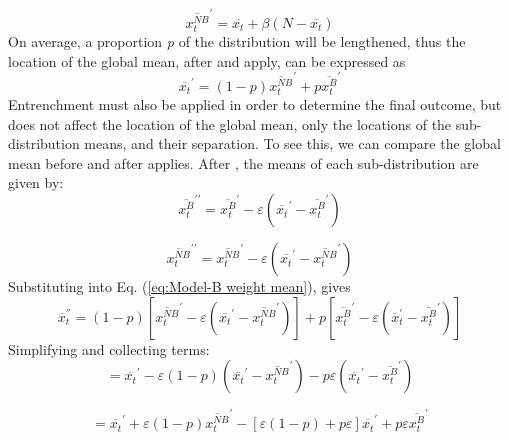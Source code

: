 \begin{equation}
\overline{x_{t}^{NB}}^{\prime}=\overline{x_{t}}+\beta(N-\overline{x_{t}})\label{eq:Model-B NB-Prime}
\end{equation}
On average, a proportion \emph{p} of the distribution will be lengthened,
thus the location of the global mean, after  and 
apply, can be expressed as
\begin{equation}
\overline{x_{t}}^{\prime}=(1-p)\overline{x_{t}^{NB}}^{\prime}+p\overline{x_{t}^{B}}^{\prime}\label{eq:Model-B weight mean}
\end{equation}
Entrenchment must also be applied in order to determine the final
outcome, but  does not affect the location of the global
mean, only the locations of the sub-distribution means, and their
separation. To see this, we can compare the global mean before and
after  applies. After , the means of each
sub-distribution are given by:
\begin{equation}
\overline{x_{t}^{B}}^{\prime\prime}=\overline{x_{t}^{B}}^{\prime}-\varepsilon\left(\overline{x_{t}}^{\prime}-\overline{x_{t}^{B}}^{\prime}\right)
\end{equation}

\begin{equation}
\overline{x_{t}^{NB}}^{\prime\prime}=\overline{x_{t}^{NB}}^{\prime}-\varepsilon\left(\overline{x_{t}}^{\prime}-\overline{x_{t}^{NB}}^{\prime}\right)
\end{equation}
Substituting into Eq. (\ref{eq:Model-B weight mean}), gives
\begin{equation}
\overline{x}_{t}^{''}=(1-p)\left[\overline{x_{t}^{NB}}^{\prime}-\varepsilon\left(\overline{x_{t}}^{\prime}-\overline{x_{t}^{NB}}^{\prime}\right)\right]+p\left[\overline{x_{t}^{B}}^{\prime}-\varepsilon\left(\overline{x}_{t}^{\prime}-\overline{x_{t}^{B}}^{\prime}\right)\right]
\end{equation}
Simplifying and collecting terms:
\begin{equation}
=\overline{x_{t}}^{\prime}-\varepsilon(1-p)\left(\overline{x_{t}}^{\prime}-\overline{x_{t}^{NB}}^{\prime}\right)-p\varepsilon\left(\overline{x_{t}}^{\prime}-\overline{x_{t}^{B}}^{\prime}\right)
\end{equation}

\begin{equation}
=\overline{x_{t}}^{\prime}+\varepsilon(1-p)\overline{x_{t}^{NB}}^{\prime}-\left[\varepsilon(1-p)+p\varepsilon\right]\overline{x_{t}}^{\prime}+p\varepsilon\overline{x_{t}^{B}}^{\prime}
\end{equation}

